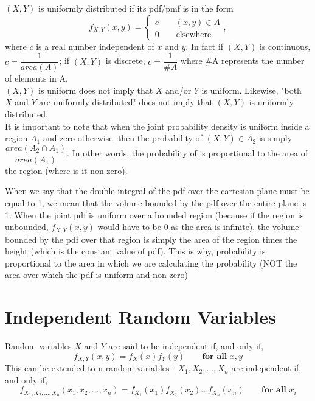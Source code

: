 \begin{note}
\end{note}
$(X,Y)$ is uniformly distributed if its pdf/pmf is in the form
$$
f_{X,Y} (x,y) = \begin{cases}
c \qquad (x,y) \in A \\
0 \qquad \text{elsewhere}
\end{cases},
$$
where $c$ is a real number independent of $x$ and $y$. In fact if $(X,Y)$ is continuous, $c = \dfrac{1}{area(A)}$; if $(X,Y)$ is discrete, $c = \dfrac{1}{\#A}$ where \#A represents the number of elements in A.\\
$(X,Y)$ is uniform does not imply that $X$ and/or $Y$ is uniform. Likewise, "both $X$ and $Y$ are uniformly distributed" does not imply that $(X,Y)$ is uniformly distributed. \\
It is important to note that when the joint probability density is uniform inside a region $A_1$ and zero otherwise, then the probability of $(X,Y) \in A_2$ is simply $\dfrac{area(A_2 \cap A_1)}{area(A_1)}$. In other words, the probability of is proportional to the area of the region (where is it non-zero).
\begin{note}
\end{note}
When we say that the double integral of the pdf over the cartesian plane must be equal to 1, we mean that the volume bounded by the pdf over the entire plane is 1. When the joint pdf is uniform over a bounded region (because if the region is unbounded, $f_{X,Y}(x,y)$ would have to be 0 as the area is infinite), the volume bounded by the pdf over that region is simply the area of the region times the height (which is the constant value of pdf). This is why, probability is proportional to the area in which we are calculating the probability (NOT the area over which the pdf is uniform and non-zero)
\section{Independent Random Variables}
\begin{definition}[Independent RV]
Random variables $X$ and $Y$ are said to be independent if, and only if, $$
f_{X,Y} (x,y) = f_X(x) f_Y(y) \qquad \textbf{for all } x,y
$$
This can be extended to n random variables - $X_1, X_2, ... , X_n$ are independent if, and only if,
$$
f_{X_1, X_2, ... , X_n}(x_1, x_2, ..., x_n) = f_{X_1}(x_1) f_{X_2}(x_2) ... f_{X_n}(x_n) \qquad \textbf{for all } x_i
$$
\end{definition}

